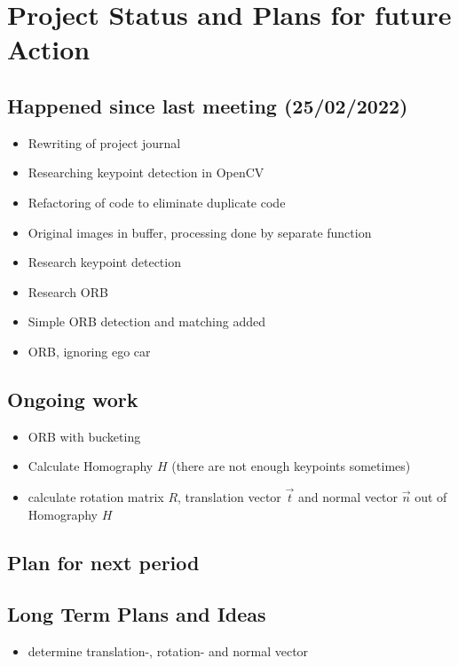 \chapter{Project Status and Plans for future Action}

\section{Happened since last meeting (25/02/2022)}
\begin{itemize}
    \item Rewriting of project journal
    \item Researching keypoint detection in OpenCV
    \item Refactoring of code to eliminate duplicate code
    \item Original images in buffer, processing done by separate function
    \item Research keypoint detection
    \item Research ORB
    \item Simple ORB detection and matching added
    \item ORB, ignoring ego car
    
\end{itemize}
\section{Ongoing work}
\begin{itemize}
    \item ORB with bucketing
    \item Calculate Homography ${H}$ (there are not enough keypoints sometimes)
    \item calculate rotation matrix ${R}$, translation vector $\vec{t}$ and normal vector $\vec{n}$ out of Homography ${H}$
\end{itemize}
\section{Plan for next period}

\section{Long Term Plans and Ideas}
\begin{itemize}
    \item determine translation-, rotation- and normal vector
\end{itemize}